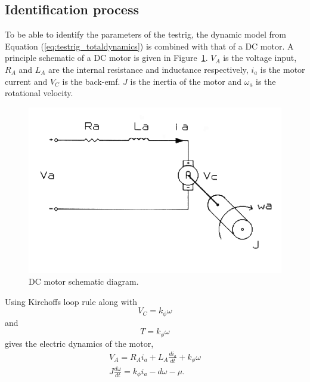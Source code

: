 \subsection{Identification process}
To be able to identify the parameters of the testrig, the dynamic model from
Equation (\ref{eq:testrig_totaldynamics}) is combined with that of a DC motor. A
principle schematic of a DC motor is given in
Figure~\ref{fig:testrig_dcmotor_model}. $V_A$ is the voltage input, $R_A$ and
$L_A$ are the internal resistance and inductance respectively, $i_a$ is the
motor current and $V_C$ is the back-emf. $J$ is the inertia of the motor and
$\omega_a$ is the rotational velocity.
\begin{figure}[H]
    \label{fig:testrig_dcmotor_model}
    \centering
    \includegraphics[width=\textwidth]{./img/testrig_dcmotor_model.png}
    \caption{DC motor schematic diagram.}
\end{figure}
Using Kirchoffs loop rule along with 
\begin{equation} \label{eq:testrig_kphi_v}
    V_C = k_{\phi} \omega
\end{equation}
and 
\begin{equation} \label{eq:testrig_kphi_i}
    T = k_{\phi} \omega
\end{equation}
gives the electric dynamics of the motor,
\begin{align} \label{eq:testrig_dcmotor}
    V_A = R_A i_a + L_A \frac{di_a}{dt} + k_{\phi}\omega \\
    J \frac{d\omega} {dt} = k_{\phi} i_a - d\omega - \mu.
\end{align}
